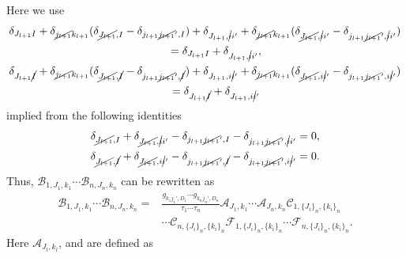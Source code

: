 \documentclass[10pt,a4paper]{amsart}
\numberwithin{equation}{section}
\begin{document}
Here we use
\begin{gather*}
 \delta_{J_{l+1}I}
 +
 \delta_{\cancel{j_{l+1}}k_{l+1}}
 (
 \delta_{\cancel{J_{l+1}},I}
 -
 \delta_{j_{l+1}\cancel{j_{l+1}}',I}
 )
 +
 \delta_{J_{l+1},\cancel{i}i'}
 +
 \delta_{\cancel{j_{l+1}}k_{l+1}}
 (
 \delta_{\cancel{J_{l+1}},\cancel{i}i'}
 -
 \delta_{j_{l+1}\cancel{j_{l+1}}',\cancel{i}i'}
 )\\
 \qquad
 =
 \delta_{J_{l+1}I}
 +
 \delta_{J_{l+1},\cancel{i}i'},
 \\
 \delta_{J_{l+1}\cancel{I}}
 +
 \delta_{\cancel{j_{l+1}}k_{l+1}}
 (
 \delta_{\cancel{J_{l+1}},\cancel{I}}
 -
 \delta_{j_{l+1}\cancel{j_{l+1}}',\cancel{I}}
 )
 +
 \delta_{J_{l+1},i\cancel{i}'}
 +
 \delta_{\cancel{j_{l+1}}k_{l+1}}
 (
 \delta_{\cancel{J_{l+1}},i\cancel{i}'}
 -
 \delta_{j_{l+1}\cancel{j_{l+1}}',i\cancel{i}'}
 )\\
 \qquad
 =
 \delta_{J_{l+1}\cancel{I}}
 +
 \delta_{J_{l+1},i\cancel{i}'}
\end{gather*}
implied from the following identities
\begin{align*}
 \delta_{\cancel{J_{l+1}},I}
 +
 \delta_{\cancel{J_{l+1}},\cancel{i}i'}
 -
 \delta_{j_{l+1}\cancel{j_{l+1}}',I}
 -
 \delta_{j_{l+1}\cancel{j_{l+1}}',\cancel{i}i'}
 &=
 0,
 \\
 \delta_{\cancel{J_{l+1}},\cancel{I}}
 +
 \delta_{\cancel{J_{l+1}},i\cancel{i}'}
 -
 \delta_{j_{l+1}\cancel{j_{l+1}}',\cancel{I}}
 -
 \delta_{j_{l+1}\cancel{j_{l+1}}',i\cancel{i}'}
 &=
 0.
\end{align*}
\noindent
Thus,
$
\mathcal{B}_{
1,
J_{1},
k_{1}
}
\cdots
\mathcal{B}_{
n,
J_{n},
k_{n}
}
$
can be rewritten as
\begin{align*}
\mathcal{B}_{
1,
J_{1},
k_{1}
}
\cdots
\mathcal{B}_{
n,
J_{n},
k_{n}
}
={}&
\frac{
 g_{\overline{k_{1}{j_{1}}'},D_{1}}
 \cdots
 g_{\overline{k_{n}{j_{n}}'},D_{n}}
}{
 \tau_{1}
 \cdots
 \tau_{n}
}
\mathcal{A}_{
J_{1},
k_{1}
}
\cdots
\mathcal{A}_{
J_{n},
k_{n}
}
\mathcal{C}_{
1,
\{
 J_{i}
\}_{n},
\{
 k_{i}
\}_{n}
}\\
&
\cdots
\mathcal{C}_{
n,
\{
 J_{i}
\}_{n},
\{
 k_{i}
\}_{n}
}
\mathcal{F}_{
1,
\{
 J_{i}
\}_{n},
\{
 k_{i}
\}_{n}
}
\cdots
\mathcal{F}_{
n,
\{
 J_{i}
\}_{n},
\{
 k_{i}
\}_{n}
}
.
\end{align*}
Here
$
\mathcal{A}_{
J_{l},
k_{l}
}
$,
and
are defined as
\end{document}
